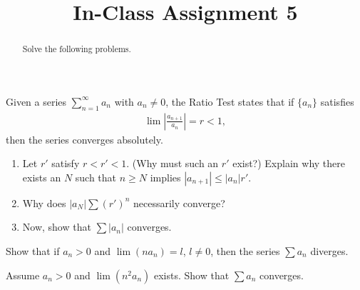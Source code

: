 \documentclass{ximera}
\begin{document}
    \title{In-Class Assignment 5}
    \begin{abstract} Solve the following problems. \end{abstract}
    \maketitle

\begin{exercise}
Given a series $\sum\limits_{n=1}^\infty a_n$ with $a_n \neq 0$, the Ratio Test states that if $\{a_n\}$ satisfies
\begin{align*}
    \lim \left|\frac{a_{n+1}}{a_n}\right| = r < 1,
\end{align*}
then the series converges absolutely.
\begin{enumerate}
    \item Let $r'$ satisfy $r< r'<1$. (Why must such an $r'$ exist?)  Explain why there exists an $N$ such that $n \geq N$ implies $|a_{n+1}| \leq |a_n|r'$.
    \item Why does $|a_N|\sum (r')^n$ necessarily converge?
    \item Now, show that $\sum |a_n|$ converges.
\end{enumerate}
\end{exercise}

\newpage

\begin{exercise}
    Show that if  $a_n > 0$ and $\lim (na_n) = l$, $l \neq 0$, then the series $\sum a_n$ diverges.
\end{exercise}
\vfill

\begin{exercise}
    Assume $a_n > 0$ and $\lim (n^2a_n) $ exists.  Show that $\sum a_n$ converges.
\end{exercise}
\vfill
\end{document}
